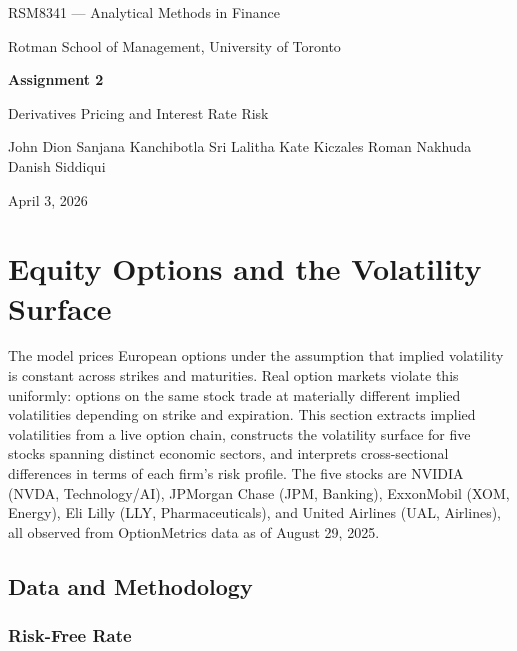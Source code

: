\documentclass[12pt, a4paper]{article}
\begin{document}
\begin{titlepage}
    \centering
    \vspace*{1.5cm}
    {\large RSM8341 --- Analytical Methods in Finance \par}
    {\large Rotman School of Management, University of Toronto \par}
    \vspace{2cm}
    {\Huge \textbf{Assignment 2} \par}
    \vspace{0.6cm}
    {\LARGE Derivatives Pricing and Interest Rate Risk \par}
    \vspace{2.5cm}
    {\large John Dion \quad Sanjana Kanchibotla Sri Lalitha \quad Kate Kiczales \quad Roman Nakhuda \quad Danish Siddiqui \par}
    \vfill
    {\large April 3, 2026 \par}
\end{titlepage}

\tableofcontents
\newpage

\section{Equity Options and the Volatility Surface}

The \citet{BlackScholes1973} model prices European options under the assumption that
implied volatility is constant across strikes and maturities. Real option markets violate
this uniformly: options on the same stock trade at materially different implied
volatilities depending on strike and expiration. This section extracts implied
volatilities from a live option chain, constructs the volatility surface for five
stocks spanning distinct economic sectors, and interprets cross-sectional differences in
terms of each firm's risk profile. The five stocks are NVIDIA (NVDA, Technology/AI),
JPMorgan Chase (JPM, Banking), ExxonMobil (XOM, Energy), Eli Lilly (LLY,
Pharmaceuticals), and United Airlines (UAL, Airlines), all observed from OptionMetrics
data as of August 29, 2025.

\subsection{Data and Methodology}

\subsubsection{Risk-Free Rate}
\end{document}
